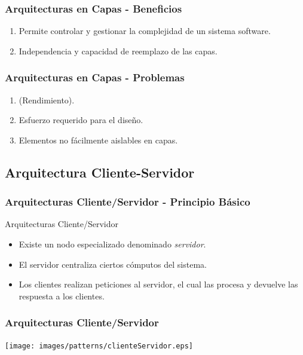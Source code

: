 \documentclass[handout,a4paper,t,xcolor=pst,dvips,colortheme]{beamer}
\begin{document}
\begin{frame}[c]
    \frametitle{Arquitecturas en Capas - Beneficios}
    \begin{enumerate}[<+->]
        \item Permite controlar y gestionar la complejidad de un sistema software.
        \item Independencia y capacidad de reemplazo de las capas.
    \end{enumerate}
\end{frame}

\begin{frame}[c]
    \frametitle{Arquitecturas en Capas - Problemas}
    \begin{enumerate}[<+->]
        \item (Rendimiento).
        \item Esfuerzo requerido para el diseño.
        \item Elementos no fácilmente aislables en capas.
    \end{enumerate}
\end{frame}

\subsection{Arquitectura Cliente-Servidor}

\begin{frame}[c]
    \frametitle{Arquitecturas Cliente/Servidor - Principio Básico}
    \begin{block}{Arquitecturas Cliente/Servidor}
        \begin{itemize}[<+->]
            \item Existe un nodo especializado denominado \emph{servidor}.
            \item El servidor centraliza ciertos cómputos del sistema.
            \item Los clientes realizan peticiones al servidor, el cual las procesa y devuelve las respuesta a los clientes.
        \end{itemize}
    \end{block}
\end{frame}

\begin{frame}[c]
	\frametitle{Arquitecturas Cliente/Servidor}
	\begin{center}
        \texttt{[image: images/patterns/clienteServidor.eps]}
	\end{center}
\end{frame}
\end{document}

